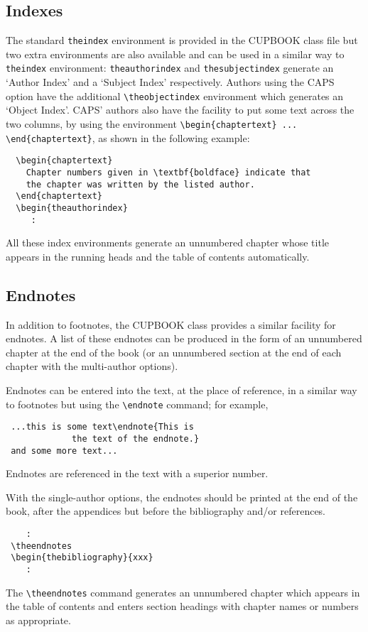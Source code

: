 \documentclass[cup6a]{cupbook}
\begin{document}
\subsection{Indexes}

The standard \verb"theindex" environment is provided in the CUPBOOK
class file but two extra environments are also available and can be
used in a similar way to \verb"theindex" environment:
\verb"theauthorindex" and \verb"thesubjectindex"
generate an `Author Index' and a `Subject Index' respectively.
Authors using the CAPS option have the additional \verb"\theobjectindex" environment which generates an `Object Index'. CAPS' authors
also have the facility to put some text across the two columns,
by using the environment \verb"\begin{chaptertext} ... \end{chaptertext}",
as shown in the following example:
\begin{verbatim}
  \begin{chaptertext}
    Chapter numbers given in \textbf{boldface} indicate that
    the chapter was written by the listed author.
  \end{chaptertext}
  \begin{theauthorindex}
     :
\end{verbatim}
All these index environments generate an unnumbered chapter whose
title appears in the running heads and the table of contents
automatically.

\subsection{Endnotes}

In addition to footnotes, the CUPBOOK class provides a similar
facility for endnotes.
 A list of these endnotes can be produced in the form of an unnumbered
chapter at the end of the book (or an unnumbered section at the end of
each chapter with the multi-author options).

Endnotes can be entered into the text, at the place of reference, in a
similar way to footnotes but using the \verb"\endnote" command;
for example,
\begin{verbatim}
 ...this is some text\endnote{This is
             the text of the endnote.}
 and some more text...
\end{verbatim}
 Endnotes are referenced in the text with a superior number.

With the single-author options, the endnotes should be printed at the
end of the book, after the appendices but before the bibliography
and/or references.
 \begin{verbatim}
    :
 \theendnotes
 \begin{thebibliography}{xxx}
    :
\end{verbatim}
The \verb"\theendnotes" command generates an unnumbered
chapter which appears in the table of contents and enters section
headings with chapter names or numbers as appropriate.
\end{document}
